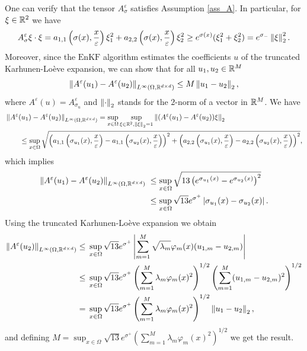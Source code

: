 \documentclass[10pt]{article}
\begin{document}
One can verify that the tensor $A^{\varepsilon}_{\sigma}$ satisfies Assumption \ref{ass_A}. In particular, for $\xi \in \mathbb{R}^2$ we have
\begin{equation*}
A^{\varepsilon}_{\sigma} \xi \cdot \xi = a_{1,1} \left ( \sigma(x), \frac{x}{\varepsilon} \right ) \xi_1^2 + a_{2,2} \left ( \sigma(x), \frac{x}{\varepsilon} \right ) \xi_2^2 \ge e^{\sigma(x)} ( \xi_1^2 + \xi_2^2 ) = e^{\sigma_-} \left\|\xi\right\|_2^2.
\end{equation*}
Moreover, since the $\mathrm{EnKF}$ algorithm estimates the coefficients $u$ of the truncated Karhunen-Lo\`eve expansion, we can show that for all $u_1, u_2 \in \mathbb{R}^M$
\begin{equation*}
\left\|A^{\varepsilon}(u_1) - A^{\varepsilon}(u_2)\right\|_{L^{\infty}(\Omega, \mathbb{R}^{d \times d})} \le M \left\|u_1 - u_2\right\|_2,
\end{equation*}
where $A^{\varepsilon}(u) = A^{\varepsilon}_{\sigma_u}$ and $\left\|\cdot\right\|_2$ stands for the $2$-norm of a vector in $\mathbb{R}^M$. We have
\begin{align*}
& \left\|A^{\varepsilon}(u_1) - A^{\varepsilon}(u_2)\right\|_{L^{\infty}(\Omega, \mathbb{R}^{d \times d})} =  \sup_{x \in \Omega} \sup_{\xi \in \mathbb{R}^2, \left\|\xi\right\|_2=1} \left\|(A^{\varepsilon}(u_1) - A^{\varepsilon}(u_2)) \xi\right\|_2 \\
& \qquad \le \sup_{x \in \Omega} \sqrt{\left ( a_{1,1} \left ( \sigma_{u_1}(x), \frac{x}{\varepsilon} \right ) - a_{1,1} \left ( \sigma_{u_2}(x), \frac{x}{\varepsilon} \right ) \right )^2 + \left ( a_{2,2} \left ( \sigma_{u_1}(x), \frac{x}{\varepsilon} \right ) - a_{2,2} \left ( \sigma_{u_2}(x), \frac{x}{\varepsilon} \right ) \right )^2},
\end{align*}
which implies
\begin{align*}
\left\|A^{\varepsilon}(u_1) - A^{\varepsilon}(u_2)\right\|_{L^{\infty}(\Omega, \mathbb{R}^{d \times d})} & \; \le \sup_{x \in \Omega} \sqrt{13 \left ( e^{\sigma_{u_1}(x)} - e^{\sigma_{u_2}(x)} \right )^2} \\
& \; \le \sup_{x \in \Omega} \sqrt{13} e^{\sigma^+} \left\lvert\sigma_{u_1}(x) - \sigma_{u_2}(x)\right\rvert.
\end{align*}
Using the truncated Karhunen-Lo\`eve expansion we obtain
\begin{align*}
\left\|A^{\varepsilon}(u_2)\right\|_{L^{\infty}(\Omega, \mathbb{R}^{d \times d})} \le & \; \sup_{x \in \Omega} \sqrt{13} e^{\sigma^+} \left | \sum_{m=1}^M \sqrt{\lambda_m} \varphi_m(x) (u_{1,m} - u_{2,m}) \right | \\
\le & \; \sup_{x \in \Omega} \sqrt{13} e^{\sigma^+} \left ( \sum_{m=1}^M \lambda_m \varphi_m(x)^2 \right )^{1/2} \left ( \sum_{m=1}^M (u_{1,m} - u_{2,m})^2 \right )^{1/2} \\
= & \; \sup_{x \in \Omega} \sqrt{13} e^{\sigma^+} \left ( \sum_{m=1}^M \lambda_m \varphi_m(x)^2 \right )^{1/2} \left\|u_1 - u_2\right\|_2,
\end{align*}
and defining $M = \sup_{x \in \Omega} \sqrt{13} e^{\sigma^+} \left ( \sum_{m=1}^M \lambda_m \varphi_m(x)^2 \right )^{1/2}$ we get the result.
\end{document}
